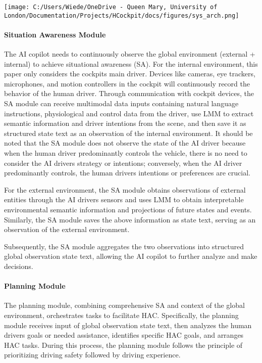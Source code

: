 \documentclass[
]{article}
\begin{document}
\texttt{[image: C:/Users/Wiede/OneDrive - Queen Mary, University of London/Documentation/Projects/HCockpit/docs/figures/sys\_arch.png]}

\paragraph{Situation Awareness Module}\label{situation-awareness-module}

The AI copilot needs to continuously observe the global environment
(external + internal) to achieve situational awareness (SA). For the
internal environment, this paper only considers the
cockpit\textquotesingle s main driver. Devices like cameras, eye
trackers, microphones, and motion controllers in the cockpit will
continuously record the behavior of the human driver. Through
communication with cockpit devices, the SA module can receive multimodal
data inputs containing natural language instructions, physiological and
control data from the driver, use LMM to extract semantic information
and driver intentions from the scene, and then save it as structured
state text as an observation of the internal environment. It should be
noted that the SA module does not observe the state of the AI driver
because when the human driver predominantly controls the vehicle, there
is no need to consider the AI driver\textquotesingle s strategy or
intentions; conversely, when the AI driver predominantly controls, the
human driver\textquotesingle s intentions or preferences are crucial.

For the external environment, the SA module obtains observations of
external entities through the AI driver\textquotesingle s sensors and
uses LMM to obtain interpretable environmental semantic information and
projections of future states and events. Similarly, the SA module saves
the above information as state text, serving as an observation of the
external environment.

Subsequently, the SA module aggregates the two observations into
structured global observation state text, allowing the AI copilot to
further analyze and make decisions.

\paragraph{Planning Module}\label{planning-module}

The planning module, combining comprehensive SA and context of the
global environment, orchestrates tasks to facilitate HAC. Specifically,
the planning module receives input of global observation state text,
then analyzes the human driver\textquotesingle s goals or needed
assistance, identifies specific HAC goals, and arranges HAC tasks.
During this process, the planning module follows the principle of
prioritizing driving safety followed by driving experience.
\end{document}
